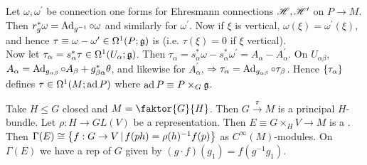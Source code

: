 \documentclass{article}
\begin{document}
\begin{example}
	Let $\omega, \omega^\prime$ be connection one forms for Ehresmann connections $\mathscr{H}, \mathscr{H}^\prime$ on $P \to M$. Then $r_g^\ast \omega = \operatorname{Ad}_{g^{-1}} \circ \omega$ and similarly for $\omega^\prime$. Now if $\xi$ is vertical, $\omega(\xi) = \omega^\prime(\xi)$, and hence $\tau \equiv \omega - \omega^\prime \in \Omega^1(P;\mathfrak{g})$ is  (i.e. $\tau(\xi) = 0$ if $\xi$ vertical). \\
	Now let $\tau_\alpha = s_\alpha^\ast \tau \in \Omega^1(U_\alpha;\mathfrak{g})$. Then $\tau_\alpha = s_\alpha^\ast \omega - s_\alpha^\ast \omega^\prime = A_\alpha - A_\alpha^\prime$. On $U_{\alpha\beta}$, $A_\alpha = \operatorname{Ad}_{g_{\alpha\beta}} \circ A_\beta + g_{\beta\alpha}^\ast \theta$, and likewise for $A_\alpha^\prime$, $\Rightarrow \tau_\alpha = \operatorname{Ad}_{g_{\alpha\beta}}\circ\tau_\beta$. Hence $\left\{ \tau_\alpha \right\}$ defines $\tau \in \Omega^1(M;\operatorname{ad} P)$ where $\operatorname{ad} P \equiv P \times_G \mathfrak{g}$. 
\end{example}

\begin{example}
	Take $H \leq G$ closed and $M= \faktor{G}{H}$. Then $G\overset{\pi}{\to}M$ is a principal $H$-bundle. Let $\rho : H \to GL(V)$ be a representation. Then $E\equiv G \times_H V \to M$ is a . Then $\Gamma(E) \cong \left\{ f:G \to V \, | \, f(ph) = \rho(h)^{-1} f(p) \right\}$ as $C^\infty(M)$-modules. On $\Gamma(E)$ we have a rep of $G$ given by $(g \cdot f)(g_1) = f(g^{-1} g_1)$.
\end{example}
\end{document}
